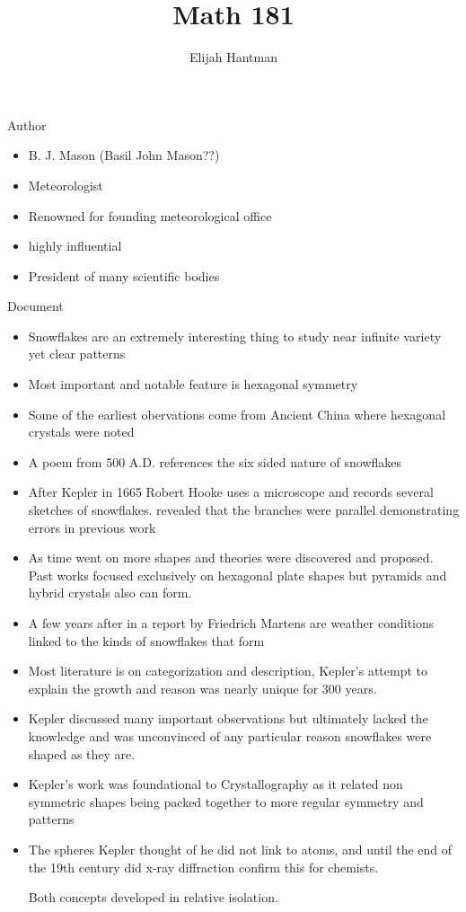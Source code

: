 \documentclass{report}
\title{\Huge{Math 181}}
\author{\huge{Elijah Hantman}}
\date{}
\begin{document}
\maketitle
\newpage

{\large Author}
\begin{itemize}
    \item B. J. Mason (Basil John Mason??)
    \item Meteorologist
    \item Renowned for founding meteorological office
    \item highly influential
    \item President of many scientific bodies
\end{itemize}

{\large Document}
\begin{itemize}
    \item Snowflakes are an extremely interesting thing to study
        near infinite variety yet clear patterns
    \item Most important and notable feature is hexagonal
        symmetry
    \item Some of the earliest obervations come from
        Ancient China where hexagonal crystals were noted
    \item A poem from 500 A.D. references the six sided
        nature of snowflakes
    \item After Kepler in 1665 Robert Hooke uses a microscope
        and records several sketches of snowflakes. revealed
        that the branches were parallel demonstrating errors
        in previous work
    \item As time went on more shapes and theories were discovered
        and proposed. Past works focused exclusively on hexagonal
        plate shapes but pyramids and hybrid crystals also
        can form.
    \item A few years after in a report by Friedrich
        Martens are weather conditions linked to the kinds of
        snowflakes that form
    \item Most literature is on categorization and description,
        Kepler's attempt to explain the growth and reason
        was nearly unique for 300 years.
    \item Kepler discussed many important observations but ultimately
        lacked the knowledge and was unconvinced of any particular
        reason snowflakes were shaped as they are.
    \item Kepler's work was foundational to Crystallography as
        it related non symmetric shapes being packed together
        to more regular symmetry and patterns
    \item The spheres Kepler thought of he did not link
        to atoms, and until the end of the 19th century
        did x-ray diffraction confirm this for chemists.

        Both concepts developed in relative isolation.
\end{itemize}
\end{document}
